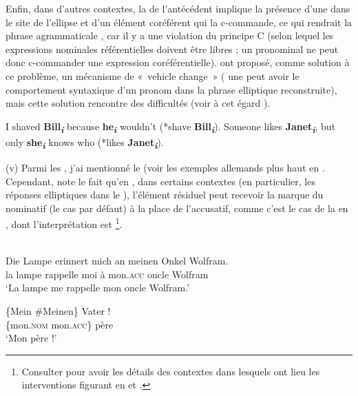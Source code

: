 Enfin, dans d’autres contextes, la  de l’antécédent implique la présence d’une  dans le site de l’ellipse et d’un élément coréférent qui la c-commande, ce qui rendrait la phrase agrammaticale , car il y a une violation du principe C (selon lequel les expressions nominales référentielles doivent être libres ; un pronominal ne peut donc c-commander une expression coréférentielle). \citet{FiengoEtAl1994} ont proposé, comme solution à ce problème, un mécanisme de «~vehicle change~» ({\cad} une  peut avoir le comportement syntaxique d’un pronom dans la phrase elliptique reconstruite), mais cette solution rencontre des difficultés (voir à cet égard \citealt{Dalrymple2005}). 

\ea \label{ch1:ex134}
\ea  I shaved \textbf{Bill}\textbf{\textit{\textsubscript{i}}} because \textbf{he}\textbf{\textit{\textsubscript{i}}} wouldn’t (*shave \textbf{Bill}\textbf{\textit{\textsubscript{i}}}). 
\ex  Someone likes \textbf{Janet}\textbf{\textit{\textsubscript{i}}}, but only \textbf{she}\textbf{\textit{\textsubscript{i}}} knows who (*likes \textbf{Janet}\textbf{\textit{\textsubscript{i}}}).
\z
\z

(v) Parmi les , j’ai mentionné le  (voir les exemples allemands plus haut en . Cependant, \citet{Stainton2006} note le fait qu’en , dans certains contextes (en particulier, les réponses elliptiques dans le ), l’élément résiduel peut recevoir la marque du nominatif (le cas par défaut) à la place de l’accusatif, comme c’est le cas de la  en , dont l’interprétation est \footnote{Consulter \citet{Stainton2006} pour avoir les détails des contextes dans lesquels ont lieu les interventions figurant en  et .}. 

\ea
{}\\
\ea 
\gll Die  Lampe  erinnert  mich  an  meinen  Onkel  Wolfram. \label{ch1:ex135a} \\
  la  lampe  rappelle  moi  à  mon.\textsc{acc}  oncle  Wolfram\\
\glt ‘La lampe me rappelle mon oncle Wolfram.’ 

\ex
\gll  \{Mein  {\textbar} \#Meinen\}  Vater ! \label{ch1:ex135b}\\
  \{mon.\textsc{nom} {\textbar} mon.\textsc{acc}\}  père  \\
\glt ‘Mon père !’ 

